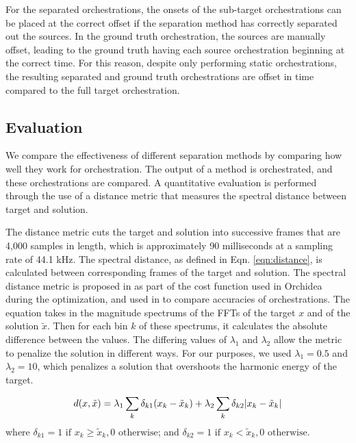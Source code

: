 \documentclass[letterpaper]{article}  %
\begin{document}
    For the separated orchestrations, the onsets of the sub-target orchestrations can be placed at the correct offset if the separation method has correctly separated out the sources. In the ground truth orchestration, the sources are manually offset, leading to the ground truth having each source orchestration beginning at the correct time. For this reason, despite only performing static orchestrations, the resulting separated and ground truth orchestrations are offset in time compared to the full target orchestration.

    \subsection{Evaluation}
    We compare the effectiveness of different separation methods by comparing how well they work for orchestration. The output of a method is orchestrated, and these orchestrations are compared. A quantitative evaluation is performed through the use of a distance metric that measures the spectral distance between target and solution.

    The distance metric cuts the target and solution into successive frames that are 4,000 samples in length, which is approximately 90 milliseconds at a sampling rate of 44.1 kHz. The spectral distance, as defined in Eqn. \ref{eqn:distance}, is calculated between corresponding frames of the target and solution. The spectral distance metric is proposed in \cite{Cella2020} as part of the cost function used in Orchidea during the optimization, and used in \cite{Cella2020b} to compare accuracies of orchestrations. The equation takes in the magnitude spectrums of the FFTs of the target $x$ and of the solution $\tilde{x}$. Then for each bin $k$ of these spectrums, it calculates the absolute difference between the values. The differing values of $\lambda_1$ and $\lambda_2$ allow the metric to penalize the solution in different ways. For our purposes, we used $\lambda_1 = 0.5$ and $\lambda_2 = 10$, which penalizes a solution that overshoots the harmonic energy of the target.

    \begin{equation}\label{eqn:distance}
d(x, \tilde{x}) =\lambda_1 \sum_k \delta_{k1}(x_k - \tilde{x}_k) + \lambda_2 \sum_k \delta_{k2}|x_k - \tilde{x  }_k| \\
\end{equation}
where $\delta_{k1} = 1 \textrm{  if  } x_k \ge \tilde{x}_k, 0 \textrm{  otherwise}$; and $\delta_{k2} = 1 \textrm{  if  } x_k < \tilde{x}_k, 0 \textrm{  otherwise}$.
\end{document}
